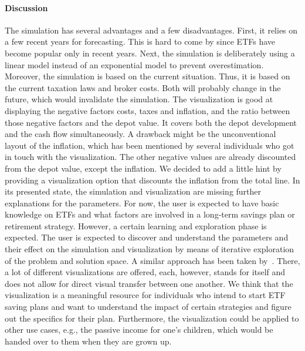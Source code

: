 \documentclass[sigconf%
,natbib=true%
]{acmart}
\begin{document}
\paragraph{Discussion}
The simulation has several advantages and a few disadvantages. 
First, it relies on a few recent years for forecasting.
This is hard to come by since ETFs have become popular only in recent years. 
Next, the simulation is deliberately using a linear model instead of an exponential model to prevent overestimation.
Moreover, the simulation is based on the current situation. 
Thus, it is based on the current taxation laws and broker costs. 
Both will probably change in the future, which would invalidate the simulation.
The visualization is good at displaying the negative factors costs, taxes and inflation, and the ratio between those negative factors and the depot value.
It covers both the depot development and the cash flow simultaneously. 
A drawback might be the unconventional layout of the inflation, which has been mentioned by several individuals who got in touch with the visualization.
The other negative values are already discounted from the depot value, except the inflation.
We decided to add a little hint by providing a visualization option that discounts the inflation from the total line.
In its presented state, the simulation and visualization are missing further explanations for the parameters. 
For now, the user is expected to have basic knowledge on ETFs and what factors are involved in a long-term savings plan or retirement strategy.
However, a certain learning and exploration phase is expected.
The user is expected to discover and understand the parameters and their effect on the simulation and visualization by means of iterative exploration of the problem and solution space.
A similar approach has been taken by~\cite{portfolio-charts}. 
There, a lot of different visualizations are offered, each, however, stands for itself and does not allow for direct visual transfer between one another.
We think that the visualization is a meaningful resource for individuals who intend to start ETF saving plans and want to understand the impact of certain strategies and figure out the specifics for their plan.
Furthermore, the visualization could be applied to other use cases, e.g., the passive income for one's children, which would be handed over to them when they are grown up.
\end{document}
